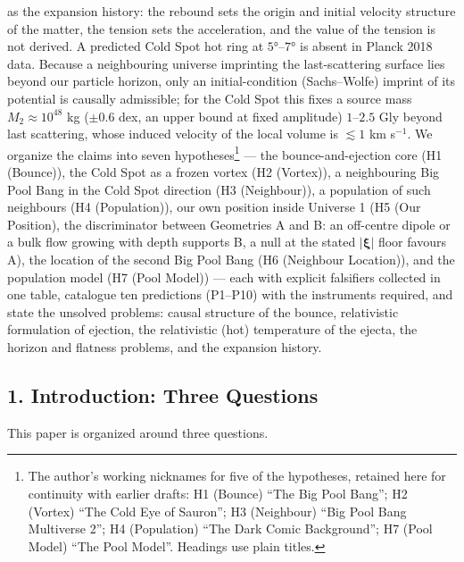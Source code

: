 \documentclass[
]{article}
\begin{document}
as the expansion history: the rebound sets the origin and initial
velocity structure of the matter, the tension sets the acceleration, and
the value of the tension is not derived. A predicted Cold Spot hot ring
at \(5°\)--\(7°\) is absent in Planck 2018 data. Because a neighbouring
universe imprinting the last-scattering surface lies beyond our particle
horizon, only an initial-condition (Sachs--Wolfe) imprint of its
potential is causally admissible; for the Cold Spot this fixes a source
mass \(M_2 \approx 10^{48}\) kg (\(\pm 0.6\) dex, an upper bound at
fixed amplitude) \(1\)--\(2.5\) Gly beyond last scattering, whose
induced velocity of the local volume is \(\lesssim 1\) km s\(^{-1}\). We
organize the claims into seven hypotheses\footnote{The author's working
  nicknames for five of the hypotheses, retained here for continuity
  with earlier drafts: H1 (Bounce) ``The Big Pool Bang''; H2 (Vortex)
  ``The Cold Eye of Sauron''; H3 (Neighbour) ``Big Pool Bang Multiverse
  2''; H4 (Population) ``The Dark Comic Background''; H7 (Pool Model)
  ``The Pool Model''. Headings use plain titles.} --- the
bounce-and-ejection core (H1 (Bounce)), the Cold Spot as a frozen vortex
(H2 (Vortex)), a neighbouring Big Pool Bang in the Cold Spot direction
(H3 (Neighbour)), a population of such neighbours (H4 (Population)), our
own position inside Universe 1 (H5 (Our Position), the discriminator
between Geometries A and B: an off-centre dipole or a bulk flow growing
with depth supports B, a null at the stated \(|\boldsymbol{\xi}|\) floor
favours A), the location of the second Big Pool Bang (H6 (Neighbour
Location)), and the population model (H7 (Pool Model)) --- each with
explicit falsifiers collected in one table, catalogue ten predictions
(P1--P10) with the instruments required, and state the unsolved
problems: causal structure of the bounce, relativistic formulation of
ejection, the relativistic (hot) temperature of the ejecta, the horizon
and flatness problems, and the expansion history.

\hypertarget{introduction-three-questions}{%
\subsection{\texorpdfstring{\textbf{1. Introduction: Three
Questions}}{1. Introduction: Three Questions}}\label{introduction-three-questions}}

This paper is organized around three questions.
\end{document}
